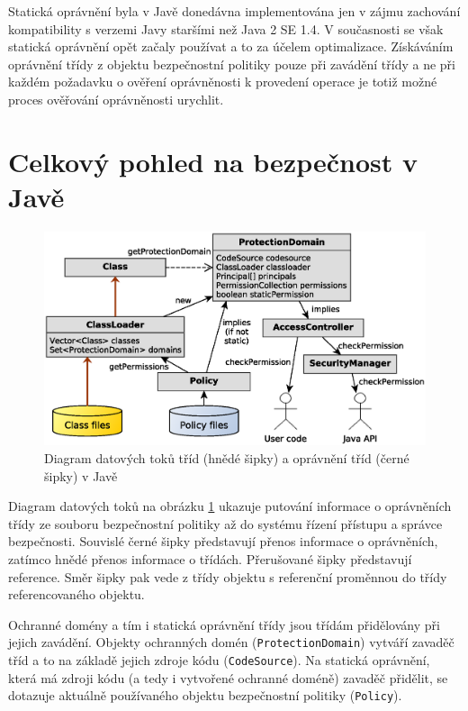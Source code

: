 Statická oprávnění byla v Javě donedávna implementována jen v zájmu zachování kompatibility s verzemi Javy staršími než Java 2 SE 1.4. \cite{sourceProtectionDomain}
V současnosti se však statická oprávnění opět začaly používat a to za účelem optimalizace.
Získáváním oprávnění třídy z objektu bezpečnostní politiky pouze při zavádění třídy a ne při každém požadavku o ověření oprávněnosti k provedení operace je totiž možné proces ověřování oprávněnosti urychlit.

\section{Celkový pohled na bezpečnost v Javě} \label{celkovyPohled}

\begin{figure}[ht]
  \centering
  \includegraphics[width=14cm]{fig/domain-schema}
  \caption{Diagram datových toků tříd (hnědé šipky) a oprávnění tříd (černé šipky) v Javě}
  \label{diagramDatovychToku}
\end{figure}

Diagram datových toků na obrázku \ref{diagramDatovychToku} ukazuje putování informace o oprávněních třídy ze souboru bezpečnostní politiky až do systému řízení přístupu a správce bezpečnosti. Souvislé černé šipky představují přenos informace o oprávněních, zatímco hnědé přenos informace o třídách. Přerušované šipky představují reference. Směr šipky pak vede z třídy objektu s referenční proměnnou do třídy referencovaného objektu.

Ochranné domény a tím i statická oprávnění třídy jsou třídám přidělovány při jejich zavádění. Objekty ochranných domén ({\tt ProtectionDomain}) vytváří zavaděč tříd a to na základě jejich zdroje kódu ({\tt CodeSource}). Na statická oprávnění, která má zdroji kódu (a tedy i vytvořené ochranné doméně) zavaděč přidělit, se dotazuje aktuálně používaného objektu bezpečnostní politiky ({\tt Policy}).


